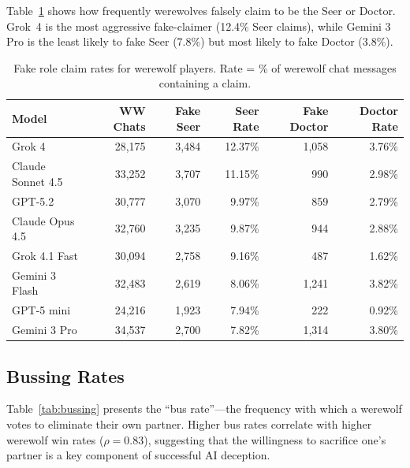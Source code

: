 Table~\ref{tab:fake_claims} shows how frequently werewolves falsely claim to be the Seer or Doctor. Grok~4 is the most aggressive fake-claimer (12.4\% Seer claims), while Gemini 3 Pro is the least likely to fake Seer (7.8\%) but most likely to fake Doctor (3.8\%).

\begin{table}[ht]
\caption{Fake role claim rates for werewolf players. Rate = \% of werewolf chat messages containing a claim.}
\label{tab:fake_claims}
\centering
\small
\begin{tabular}{lrrrrr}
\toprule
\textbf{Model} & \textbf{WW Chats} & \textbf{Fake Seer} & \textbf{Seer Rate} & \textbf{Fake Doctor} & \textbf{Doctor Rate} \\
\midrule
Grok 4                  & 28,175 & 3,484 & 12.37\% & 1,058 & 3.76\% \\
Claude Sonnet 4.5       & 33,252 & 3,707 & 11.15\% &   990 & 2.98\% \\
GPT-5.2                 & 30,777 & 3,070 &  9.97\% &   859 & 2.79\% \\
Claude Opus 4.5         & 32,760 & 3,235 &  9.87\% &   944 & 2.88\% \\
Grok 4.1 Fast           & 30,094 & 2,758 &  9.16\% &   487 & 1.62\% \\
Gemini 3 Flash          & 32,483 & 2,619 &  8.06\% & 1,241 & 3.82\% \\
GPT-5 mini              & 24,216 & 1,923 &  7.94\% &   222 & 0.92\% \\
Gemini 3 Pro            & 34,537 & 2,700 &  7.82\% & 1,314 & 3.80\% \\
\bottomrule
\end{tabular}
\end{table}


\subsection{Bussing Rates}
\label{app:bussing}

Table~\ref{tab:bussing} presents the ``bus rate''---the frequency with which a werewolf votes to eliminate their own partner. Higher bus rates correlate with higher werewolf win rates ($\rho = 0.83$), suggesting that the willingness to sacrifice one's partner is a key component of successful AI deception.

